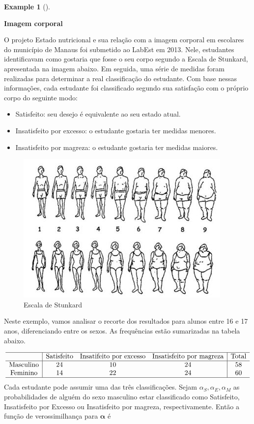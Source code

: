 \documentclass[
  letterpaper,
  DIV=11,
  numbers=noendperiod]{scrreprt}
\theoremstyle{plain}
\theoremstyle{definition}
\newtheorem{example}{Example}[chapter]
\theoremstyle{definition}
\theoremstyle{remark}
\begin{document}
\begin{example}[]\protect\hypertarget{exm-}{}\label{exm-}

\textbf{Imagem corporal}

O projeto Estado nutricional e sua relação com a imagem corporal em
escolares do município de Manaus foi submetido ao LabEst em 2013. Nele,
estudantes identificavam como gostaria que fosse o seu corpo segundo a
Escala de Stunkard, apresentada na imagem abaixo. Em seguida, uma série
de medidas foram realizadas para determinar a real classificação do
estudante. Com base nessas informações, cada estudante foi classificado
segundo sua satisfação com o próprio corpo do seguinte modo:

\begin{itemize}
\item
  Satisfeito: seu desejo é equivalente ao seu estado atual.
\item
  Insatisfeito por excesso: o estudante gostaria ter medidas menores.
\item
  Insatisfeito por magreza: o estudante gostaria ter medidas maiores.
\end{itemize}

\begin{figure}[H]

{\centering \includegraphics{percepcao-da-imagem-corporal-do-estudante-01.jpg}

}

\caption{Escala de Stunkard}

\end{figure}%

Neste exemplo, vamos analisar o recorte dos resultados para alunos entre
16 e 17 anos, diferenciando entre os sexos. As frequências estão
sumarizadas na tabela abaixo.

\[\begin{array}{c|ccc|c}\hline
&\hbox{Satisfeito} & \hbox{Insatifeito por excesso} & \hbox{Insatisfeito por magreza} &\hbox{Total}\\ \hline
\hbox{Masculino} & 24 & 10 & 24 & 58 \\
\hbox{Feminino} & 14 & 22 & 24 & 60 \\ \hline
\end{array}
\] Cada estudante pode assumir uma das três classificações. Sejam
\(\alpha_S,\alpha_E,\alpha_M\) as probabilidades de alguém do sexo
masculino estar classificado como Satisfeito, Insatisfeito por Excesso
ou Insatisfeito por magreza, respectivamente. Então a função de
verossimilhança para \(\boldsymbol{\alpha}\) é


\end{example}
\end{document}
